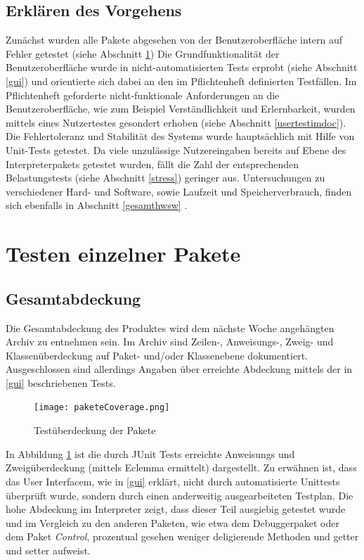 \documentclass[parskip=full]{scrartcl}
\begin{document}
\subsection{Erklären des Vorgehens}
Zunächst wurden alle Pakete abgesehen von der Benutzeroberfläche intern auf Fehler getestet (siehe Abschnitt \ref{einzelnePakete})
Die Grundfunktionalität der Benutzeroberfläche wurde in nicht-automatisierten Tests erprobt (siehe Abschnitt \ref{gui}) und orientierte sich dabei an den im Pflichtenheft definierten Testfällen. Im Pflichtenheft geforderte nicht-funktionale Anforderungen an die Benutzeroberfläche, wie zum Beispiel Verständlichkeit und Erlernbarkeit, wurden mittels eines Nutzertestes gesondert erhoben (siehe Abschnitt \ref{usertestimdoc}).
Die Fehlertoleranz und Stabilität des Systems wurde hauptsächlich mit Hilfe von Unit-Tests getestet. Da viele unzulässige Nutzereingaben bereits auf Ebene des Interpreterpakets getestet wurden, fällt die Zahl der entsprechenden Belastungstests (siehe Abschnitt \ref{stress}) geringer aus. Untersuchungen zu verschiedener Hard- und Software, sowie Laufzeit und Speicherverbrauch, finden sich ebenfalls in Abschnitt \ref{gesamthwsw} .

\newpage
\section{Testen einzelner Pakete}\label{einzelnePakete}

\subsection{Gesamtabdeckung}\label{abdeckung}
Die Gesamtabdeckung des Produktes wird dem nächste Woche angehängten Archiv zu entnehmen sein.
Im Archiv sind Zeilen-, Anweisungs-, Zweig- und Klassenüberdeckung auf Paket- und/oder Klassenebene dokumentiert.
Ausgeschlossen sind allerdings Angaben über erreichte Abdeckung mittels der in \ref{gui} beschriebenen Tests.
\begin{figure}[!h]
\centering
\texttt{[image: paketeCoverage.png]}
\caption{Testüberdeckung der Pakete}\label{AbdeckungPakete}
\end{figure}

In Abbildung \ref{AbdeckungPakete} ist die durch JUnit Tests erreichte Anweisungs und Zweigüberdeckung (mittels Eclemma ermittelt) dargestellt. Zu erwähnen ist, dass das User Interfacem, wie in \ref{gui} erklärt, nicht durch automatisierte Unittests überprüft wurde, sondern durch einen anderweitig ausgearbeiteten Testplan. Die hohe Abdeckung im Interpreter zeigt, dass dieser Teil ausgiebig getestet wurde und im Vergleich zu den anderen Paketen, wie etwa dem Debuggerpaket oder dem Paket \textit{Control}, prozentual gesehen weniger deligierende Methoden und getter und setter aufweist.
\end{document}
